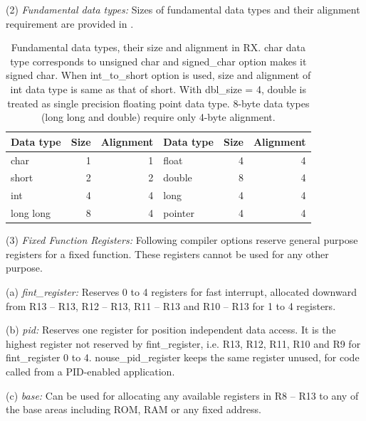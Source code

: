 \levelone    
(2) \emph{Fundamental data types:} %
Sizes of fundamental data types and their alignment requirement are provided in 
.

\begin{table}
\begin{center}
\scriptsize
\begin{tabular}{lrr|lrr}
\hline
Data type & Size & Alignment & Data type & Size & Alignment \\ \hline
char      & 1    & 1         & float     & 4    & 4         \\
short     & 2    & 2         & double    & 8    & 4         \\
int       & 4    & 4         & long      & 4    & 4         \\
long long & 8    & 4         & pointer   & 4    & 4         \\ \hline
\end{tabular}
\end{center}
\captionsetup{font=scriptsize, labelfont=scriptsize}
\caption{Fundamental data types, their size and alignment in RX. char data type corresponds to unsigned char and 
signed\_char option makes it signed char. When int\_to\_short option is used, size 
and alignment of int data type is same as that of short. With dbl\_size = 4, double is treated as single precision 
floating point data type. 8-byte data types (long long and double) require only 4-byte alignment.}
\end{table}

\levelone
(3) \emph{Fixed Function Registers:} %
Following compiler options reserve general purpose registers for a fixed function. These registers cannot 
be used for any other purpose.

    \leveltwo
    (a) \emph{fint\_register:} %
    Reserves 0 to 4 registers for fast interrupt, allocated downward from R13 -- R13, R12 -- R13, 
    R11 -- R13 and R10 -- R13 for 1 to 4 registers.

    (b) \emph{pid:} %
    Reserves one register for position independent data access. It is the highest register not 
    reserved by fint\_register, i.e. R13, R12, R11, R10 and R9 for fint\_register 0 to 4. 
    nouse\_pid\_register keeps the same register unused, for code called from a PID-enabled 
    application.

    (c) \emph{base:} %
    Can be used for allocating any available registers in R8 -- R13 to any of the base areas 
    including ROM, RAM or any fixed address.

